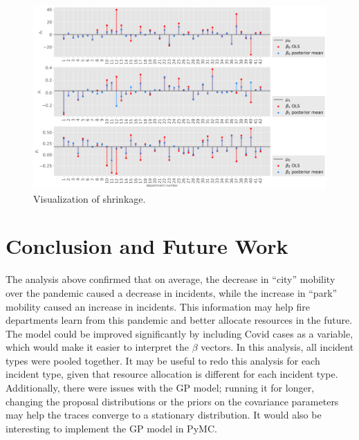 \documentclass[paper=a4, fontsize=11pt]{scrartcl}
\begin{document}
\begin{figure}[!htb]
\centering
\includegraphics[width=1\textwidth]{project/writeup/shrinkage.png}
\caption{Visualization of shrinkage.}
\label{shrink}
\end{figure}


\section{Conclusion and Future Work}
The analysis above confirmed that on average, the decrease in ``city'' mobility over the pandemic caused a decrease in incidents, while the increase in ``park'' mobility caused an increase in incidents. This information may help fire departments learn from this pandemic and better allocate resources in the future. The model could be improved significantly by including Covid cases as a variable, which would make it easier to interpret the $\beta$ vectors. In this analysis, all incident types were pooled together. It may be useful to redo this analysis for each incident type, given that resource allocation is different for each incident type. Additionally, there were issues with the GP model; running it for longer, changing the proposal distributions or the priors on the covariance parameters may help the traces converge to a stationary distribution. It would also be interesting to implement the GP model in PyMC. 


 

\end{document}
